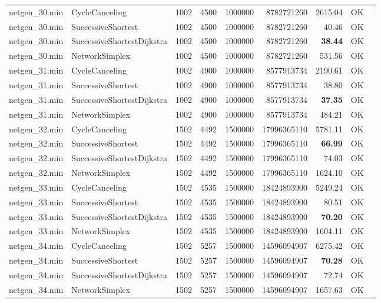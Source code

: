 \begin{longtable}{llrrrrrrl}
\midrule
netgen\_30.min & CycleCanceling & 1002 & 4500 & 1000000 & 8782721260 & 2615.04 & OK \\
netgen\_30.min & SuccessiveShortest & 1002 & 4500 & 1000000 & 8782721260 & 40.46 & OK \\
netgen\_30.min & SuccessiveShortestDijkstra & 1002 & 4500 & 1000000 & 8782721260 & \textbf{38.44} & OK \\
netgen\_30.min & NetworkSimplex & 1002 & 4500 & 1000000 & 8782721260 & 531.56 & OK \\
\midrule
netgen\_31.min & CycleCanceling & 1002 & 4900 & 1000000 & 8577913734 & 2190.61 & OK \\
netgen\_31.min & SuccessiveShortest & 1002 & 4900 & 1000000 & 8577913734 & 38.80 & OK \\
netgen\_31.min & SuccessiveShortestDijkstra & 1002 & 4900 & 1000000 & 8577913734 & \textbf{37.35} & OK \\
netgen\_31.min & NetworkSimplex & 1002 & 4900 & 1000000 & 8577913734 & 484.21 & OK \\
\midrule
netgen\_32.min & CycleCanceling & 1502 & 4492 & 1500000 & 17996365110 & 5781.11 & OK \\
netgen\_32.min & SuccessiveShortest & 1502 & 4492 & 1500000 & 17996365110 & \textbf{66.99} & OK \\
netgen\_32.min & SuccessiveShortestDijkstra & 1502 & 4492 & 1500000 & 17996365110 & 74.03 & OK \\
netgen\_32.min & NetworkSimplex & 1502 & 4492 & 1500000 & 17996365110 & 1624.10 & OK \\
\midrule
netgen\_33.min & CycleCanceling & 1502 & 4535 & 1500000 & 18424893900 & 5249.24 & OK \\
netgen\_33.min & SuccessiveShortest & 1502 & 4535 & 1500000 & 18424893900 & 80.51 & OK \\
netgen\_33.min & SuccessiveShortestDijkstra & 1502 & 4535 & 1500000 & 18424893900 & \textbf{70.20} & OK \\
netgen\_33.min & NetworkSimplex & 1502 & 4535 & 1500000 & 18424893900 & 1604.11 & OK \\
\midrule
netgen\_34.min & CycleCanceling & 1502 & 5257 & 1500000 & 14596094907 & 6275.42 & OK \\
netgen\_34.min & SuccessiveShortest & 1502 & 5257 & 1500000 & 14596094907 & \textbf{70.28} & OK \\
netgen\_34.min & SuccessiveShortestDijkstra & 1502 & 5257 & 1500000 & 14596094907 & 72.74 & OK \\
netgen\_34.min & NetworkSimplex & 1502 & 5257 & 1500000 & 14596094907 & 1657.63 & OK \\

\end{longtable}
